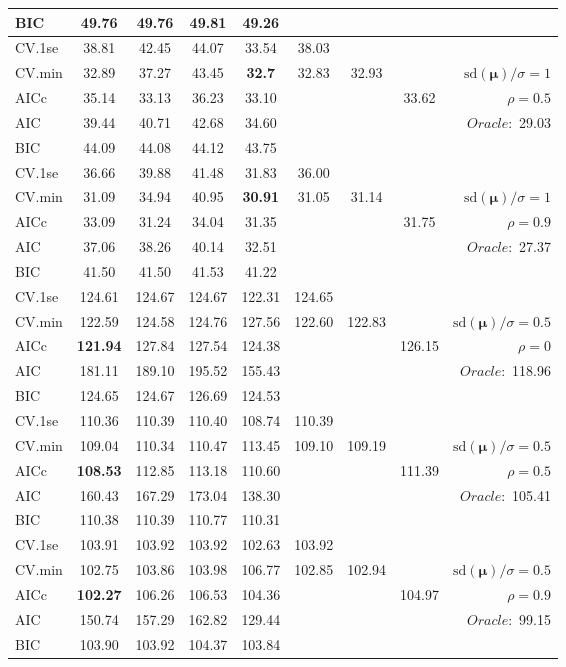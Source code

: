 \begin{table}
\begin{center}
\begin{tabular}{l*{7}{c}|r}
BIC & 49.76 & 49.76 & 49.81 & 49.26 & & & &  \\
 \hline 
CV.1se & 38.81 & 42.45 & 44.07 & 33.54 & 38.03 & & & \\
CV.min & 32.89 & 37.27 & 43.45 & {\bf 32.7} & 32.83 & 32.93 & & $\mathrm{sd}(\mathbf{\mu})/\sigma=1$ \\
AICc & 35.14 & 33.13 & 36.23 & 33.10 & & & 33.62 &  $\rho=0.5$ \\
AIC & 39.44 & 40.71 & 42.68 & 34.60 & & & &  \multirow{2}{*}{$Oracle: $ 29.03} \\
BIC & 44.09 & 44.08 & 44.12 & 43.75 & & & &  \\
 \hline 
CV.1se & 36.66 & 39.88 & 41.48 & 31.83 & 36.00 & & & \\
CV.min & 31.09 & 34.94 & 40.95 & {\bf 30.91} & 31.05 & 31.14 & & $\mathrm{sd}(\mathbf{\mu})/\sigma=1$ \\
AICc & 33.09 & 31.24 & 34.04 & 31.35 & & & 31.75 &  $\rho=0.9$ \\
AIC & 37.06 & 38.26 & 40.14 & 32.51 & & & &  \multirow{2}{*}{$Oracle: $ 27.37} \\
BIC & 41.50 & 41.50 & 41.53 & 41.22 & & & &  \\
 \hline 
CV.1se & 124.61 & 124.67 & 124.67 & 122.31 & 124.65 & & & \\
CV.min & 122.59 & 124.58 & 124.76 & 127.56 & 122.60 & 122.83 & & $\mathrm{sd}(\mathbf{\mu})/\sigma=0.5$ \\
AICc & {\bf 121.94} & 127.84 & 127.54 & 124.38 & & & 126.15 &  $\rho=0$ \\
AIC & 181.11 & 189.10 & 195.52 & 155.43 & & & &  \multirow{2}{*}{$Oracle: $ 118.96} \\
BIC & 124.65 & 124.67 & 126.69 & 124.53 & & & &  \\
 \hline 
CV.1se & 110.36 & 110.39 & 110.40 & 108.74 & 110.39 & & & \\
CV.min & 109.04 & 110.34 & 110.47 & 113.45 & 109.10 & 109.19 & & $\mathrm{sd}(\mathbf{\mu})/\sigma=0.5$ \\
AICc & {\bf 108.53} & 112.85 & 113.18 & 110.60 & & & 111.39 &  $\rho=0.5$ \\
AIC & 160.43 & 167.29 & 173.04 & 138.30 & & & &  \multirow{2}{*}{$Oracle: $ 105.41} \\
BIC & 110.38 & 110.39 & 110.77 & 110.31 & & & &  \\
 \hline 
CV.1se & 103.91 & 103.92 & 103.92 & 102.63 & 103.92 & & & \\
CV.min & 102.75 & 103.86 & 103.98 & 106.77 & 102.85 & 102.94 & & $\mathrm{sd}(\mathbf{\mu})/\sigma=0.5$ \\
AICc & {\bf 102.27} & 106.26 & 106.53 & 104.36 & & & 104.97 &  $\rho=0.9$ \\
AIC & 150.74 & 157.29 & 162.82 & 129.44 & & & &  \multirow{2}{*}{$Oracle: $ 99.15} \\
BIC & 103.90 & 103.92 & 104.37 & 103.84 & & & &  \\
 \hline 
\end{tabular}
\end{center}
\vspace{-1cm}
\end{table}





